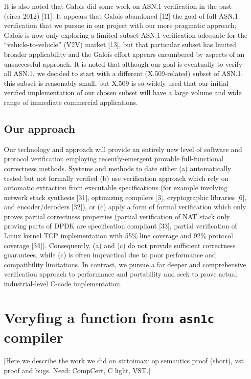 \documentclass[acmsmall,nonacm]{acmart}
\begin{document}
It is also noted that Galois did some work on ASN.1 verification in the past (circa 2012) [11]. It appears that Galois abandoned [12] the goal of full ASN.1 verification that we pursue in our project with our more pragmatic approach; Galois is now only exploring a limited subset ASN.1 verification adequate for the “vehicle-to-vehicle” (V2V) market [13], but that particular subset has limited broader applicability and the Galois effort appears encumbered by aspects of an unsuccessful  approach. It is noted that although our goal is eventually to verify all ASN.1, we decided to start with a different (X.509-related) subset of ASN.1; this subset is reasonably small, but X.509 is so widely used that our initial verified implementation of our chosen subset will have a large volume and wide range of immediate commercial applications.

\subsection{Our approach}
  Our technology and approach will provide an entirely new level of software and protocol verification employing recently-emergent provable full-functional correctness methods.
  Systems and methods to date either (a) automatically tested but not formally verified (b) use verification approach which rely on automatic extraction from executable specifications (for example involving network stack synthesis [31], optimizing compilers [3], cryptographic libraries [6], and encoder/decoders [32]), or (c) apply a form of formal verification which only proves partial correctness properties (partial verification of NAT stack only proving parts of DPDK are specification compliant [33], partial verification of Linux kernel TCP implementation with 55\% line coverage and 92\% protocol coverage [34]). Consequently, (a) and (c) do not provide sufficient correctness guarantees, while (c) is often impractical due to poor performance and compatibility limitations. In contrast, we pursue a far deeper and comprehensive verification approach to performance and portability and seek to prove actual industrial-level C-code implementation.



\section{Veryfing a function from \texttt{asn1c} compiler}

[Here we describe the work we did on strtoimax: op semantics proof (short), vst proof and bugs. Need: CompCert, C light, VST.]
\end{document}
